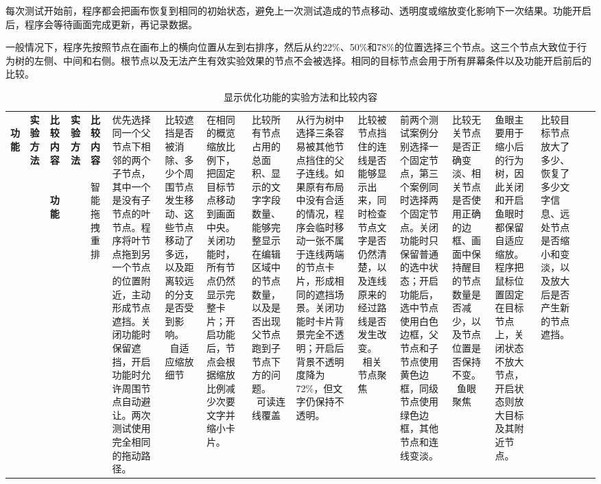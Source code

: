 \documentclass[11pt,a4paper,oneside,extrafontsizes]{memoir}
\begin{document}
每次测试开始前，程序都会把画布恢复到相同的初始状态，避免上一次测试造成的节点移动、透明度或缩放变化影响下一次结果。功能开启后，程序会等待画面完成更新，再记录数据。

一般情况下，程序先按照节点在画布上的横向位置从左到右排序，然后从约22\%、50\%和78\%的位置选择三个节点。这三个节点大致位于行为树的左侧、中间和右侧。根节点以及无法产生有效实验效果的节点不会被选择。相同的目标节点会用于所有屏幕条件以及功能开启前后的比较。


\begin{center}

\begin{longtable}{@{}p{} p{} p{}@{}}
\caption{显示优化功能的实验方法和比较内容}\label{tab:display-experiment-methods}\
\toprule
\textbf{功能} & \textbf{实验方法} & \textbf{比较内容} \
\midrule
\endfirsthead
\multicolumn{3}{l}{\itshape 续表}\
\toprule
\textbf{功能} & \textbf{实验方法} & \textbf{比较内容} \
\midrule
\endhead
智能拖拽重排 & 优先选择同一个父节点下相邻的两个子节点，其中一个是没有子节点的叶节点。程序将叶节点拖到另一个节点的位置附近，主动形成节点遮挡。关闭功能时保留遮挡，开启功能时允许周围节点自动避让。两次测试使用完全相同的拖动路径。 & 比较遮挡是否被消除、多少个周围节点发生移动、这些节点移动了多远，以及距离较远的分支是否受到影响。 \
自适应缩放细节 & 在相同的概览缩放比例下，把固定目标节点移动到画面中央。关闭功能时，所有节点仍然显示完整卡片；开启功能后，节点会根据缩放比例减少次要文字并缩小卡片。 & 比较所有节点占用的总面积、显示的文字字段数量、能够完整显示在编辑区域中的节点数量，以及是否出现父节点跑到子节点下方的问题。 \
可读连线覆盖 & 从行为树中选择三条容易被其他节点挡住的父子连线。如果原有布局中没有合适的情况，程序会临时移动一张不属于连线两端的节点卡片，形成相同的遮挡场景。关闭功能时卡片背景完全不透明；开启后背景不透明度降为72\%，但文字仍保持不透明。 & 比较被节点挡住的连线是否能够显示出来，同时检查节点文字是否仍然清楚，以及连线原来的经过路线是否发生改变。 \
相关节点聚焦 & 前两个测试案例分别选择一个固定节点，第三个案例同时选择两个固定节点。关闭功能时只保留普通的选中状态；开启功能后，选中节点使用白色边框，父节点和子节点使用黄色边框，同级节点使用绿色边框，其他节点和连线变淡。 & 比较无关节点是否正确变淡、相关节点是否使用正确的边框、画面中保持醒目的节点数量是否减少，以及节点位置是否保持不变。 \
鱼眼聚焦 & 鱼眼主要用于缩小后的行为树，因此关闭和开启鱼眼时都保留自适应缩放。程序把鼠标位置固定在目标节点上，关闭状态不放大节点，开启状态则放大目标及其附近节点。 & 比较目标节点放大了多少、恢复了多少文字信息、远处节点是否缩小和变淡，以及放大后是否产生新的节点遮挡。 \
\bottomrule
\end{longtable}
\end{center}
\end{document}
